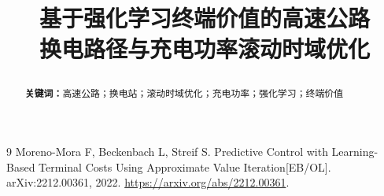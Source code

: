 \documentclass[12pt,a4paper,UTF8]{ctexart}
\title{\vspace{1.6cm}\heiti\LARGE 基于强化学习终端价值的高速公路\\[0.4em]换电路径与充电功率滚动时域优化\par\vspace{1.2cm}}
\author{\relax}
\date{}
\numberwithin{equation}{section}
\begin{document}
\cover
\thispagestyle{empty}
\clearpage
\begin{abstract}

\medskip
\noindent\textbf{关键词：}高速公路；换电站；滚动时域优化；充电功率；强化学习；终端价值
\end{abstract}
\clearpage
\tableofcontents
\clearpage







\appendix

\begin{thebibliography}{9}
Moreno-Mora F, Beckenbach L, Streif S.
Predictive Control with Learning-Based Terminal Costs Using Approximate Value Iteration[EB/OL].
arXiv:2212.00361, 2022.
\url{https://arxiv.org/abs/2212.00361}.
\end{thebibliography}
\end{document}
